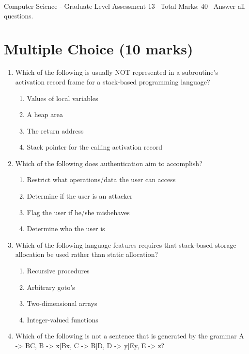 \documentclass[12pt]{article}
\begin{document}
\begin{center}
Computer Science - Graduate Level Assessment 13 \
Total Marks: 40 \
Answer all questions.
\end{center}

\section*{Multiple Choice (10 marks)}
\begin{enumerate}[label=\arabic*.]
\item Which of the following is usually NOT represented in a subroutine's activation record frame for a stack-based programming language?
\begin{enumerate}[label=(\alph*)]
    \item Values of local variables
    \item A heap area
    \item The return address
    \item Stack pointer for the calling activation record
\end{enumerate}
\item Which of the following does authentication aim to accomplish?
\begin{enumerate}[label=(\alph*)]
    \item Restrict what operations/data the user can access
    \item Determine if the user is an attacker
    \item Flag the user if he/she misbehaves
    \item Determine who the user is
\end{enumerate}
\item Which of the following language features requires that stack-based storage allocation be used rather than static allocation?
\begin{enumerate}[label=(\alph*)]
    \item Recursive procedures
    \item Arbitrary goto's
    \item Two-dimensional arrays
    \item Integer-valued functions
\end{enumerate}
\item Which of the following is not a sentence that is generated by the grammar A -\textgreater{} BC, B -\textgreater{} x|Bx, C -\textgreater{} B|D, D -\textgreater{} y|Ey, E -\textgreater{} z?
\begin{enumerate}[label=(\alph*)]

\end{enumerate}
\end{enumerate}
\end{document}
